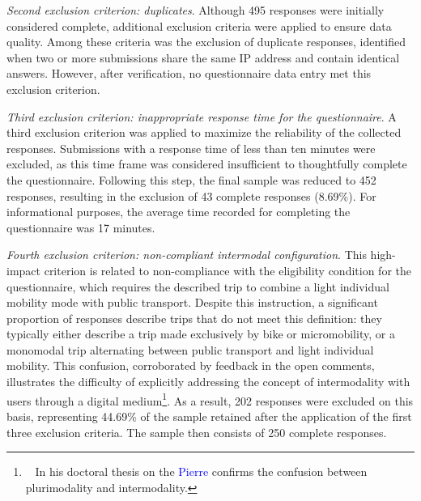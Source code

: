 \begin{refsegment}
\textsl{Second exclusion criterion: duplicates}. Although 495 responses were initially considered complete, additional exclusion criteria were applied to ensure data quality. Among these criteria was the exclusion of duplicate responses, identified when two or more submissions share the same IP address and contain identical answers. However, after verification, no questionnaire data entry met this exclusion criterion.%

\textsl{Third exclusion criterion: inappropriate response time for the questionnaire}. A third exclusion criterion was applied to maximize the reliability of the collected responses. Submissions with a response time of less than ten minutes were excluded, as this time frame was considered insufficient to thoughtfully complete the questionnaire. Following this step, the final sample was reduced to 452 responses, resulting in the exclusion of 43 complete responses (8.69\%). For informational purposes, the average time recorded for completing the questionnaire was 17 minutes.%

\textsl{Fourth exclusion criterion: non-compliant intermodal configuration}. This high-impact criterion is related to non-compliance with the eligibility condition for the questionnaire, which requires the described trip to combine a light individual mobility mode with public transport. Despite this instruction, a significant proportion of responses describe trips that do not meet this definition: they typically either describe a trip made exclusively by bike or micromobility, or a monomodal trip alternating between public transport and light individual mobility. This confusion, corroborated by feedback in the open comments, illustrates the difficulty of explicitly addressing the concept of intermodality with users through a digital medium\footnote{~
    In his doctoral thesis on the  \textcolor{blue}{Pierre} \textcolor{blue}{\textcite[41]{ageron_intermodalite-voyageurs_2013}} confirms the confusion between plurimodality and intermodality.
}. As a result, 202 responses were excluded on this basis, representing 44.69\% of the sample retained after the application of the first three exclusion criteria. The sample then consists of 250 complete responses.%


\end{refsegment}
